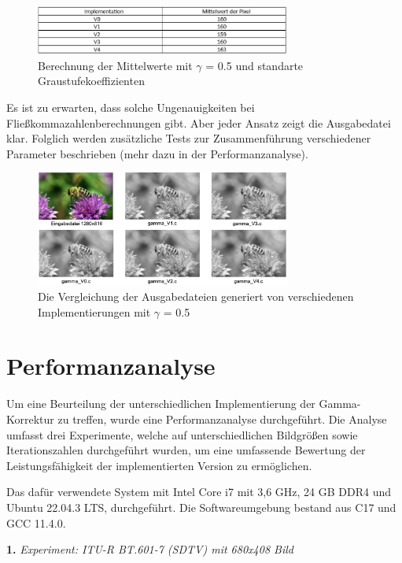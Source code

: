 \documentclass[course=erap]{aspdoc}
\begin{document}
\begin{figure}[h]
\centering
\includegraphics[width = 0.75\textwidth]{images/table.png}
\caption{Berechnung der Mittelwerte mit $\gamma$ = 0.5 und standarte Graustufekoeffizienten}
\label{fig:8}
\end{figure}

Es ist zu erwarten, dass solche Ungenauigkeiten bei Fließkommazahlenberechnungen gibt. Aber jeder Ansatz zeigt die Ausgabedatei klar. Folglich werden zusätzliche Tests zur Zusammenführung verschiedener Parameter beschrieben (mehr dazu in der Performanzanalyse).

\begin{figure}[h]
\centering
\includegraphics[width = 0.75\textwidth]{images/korrekt_pic.png}
\caption{Die Vergleichung der Ausgabedateien generiert von verschiedenen Implementierungen mit $\gamma$ = 0.5}
\label{fig:7}
\end{figure}

\section{Performanzanalyse}
Um eine Beurteilung der unterschiedlichen Implementierung der Gamma-Korrektur zu treffen, wurde eine Performanzanalyse durchgeführt. Die Analyse umfasst drei Experimente, welche auf unterschiedlichen Bildgrößen sowie Iterationszahlen durchgeführt wurden, um eine umfassende Bewertung der Leistungsfähigkeit der implementierten Version zu ermöglichen.

Das dafür verwendete System mit  Intel Core i7 mit 3,6 GHz, 24 GB DDR4 und Ubuntu 22.04.3 LTS, durchgeführt. Die Softwareumgebung bestand aus  C17 und GCC 11.4.0.

\textbf{1.} \textit{Experiment: ITU-R BT.601-7 (SDTV) mit 680x408 Bild}
\end{document}
